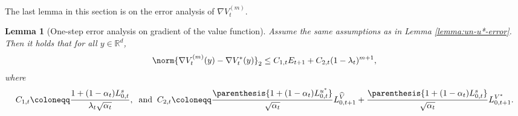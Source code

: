 \documentclass{article}
\newtheorem{Lemma}[Theorem]{Lemma}
\newcommand{\R}{\mathbb{R}}
\begin{document}
The last lemma in this section is on the error analysis of $\nabla V_t^{(m)}$. 

\begin{Lemma}[One-step error analysis on gradient of the value function]\label{lemma:nabla-Vn-V*-error}
    Assume the same assumptions as in Lemma \ref{lemma:un-u*-error}. Then it holds that for all $y\in \R^d$,
    \begin{align}
    \norm{\nabla V_{t}^{(m)}(y) -  \nabla V_{t}^{*}(y)}_2  \leq C_{1, t}E_{t+1} + C_{2, t}(1 - \lambda_t)^{m+1}, \label{eq:error-nabla-v}
\end{align}
where 
\begin{align*}
    C_{1,t} \coloneqq  \frac{1 + (1 - \alpha_t)L_{0, t}^{s}}{\lambda_t\sqrt{\alpha_t}} , \;\; \text{and} \;\; C_{2, t} \coloneqq  \frac{\parenthesis{1 + (1 - \alpha_t)L_{0, t}^{u^*}}}{\sqrt{\alpha_t}}L_{0, t+1}^{\widehat{V}} +  \frac{\parenthesis{1 + (1 - \alpha_t)L_{0, t}^{s}}}{\sqrt{\alpha_t}}L_{0, t+1}^{V^*}.
\end{align*}
\end{Lemma}
\end{document}
